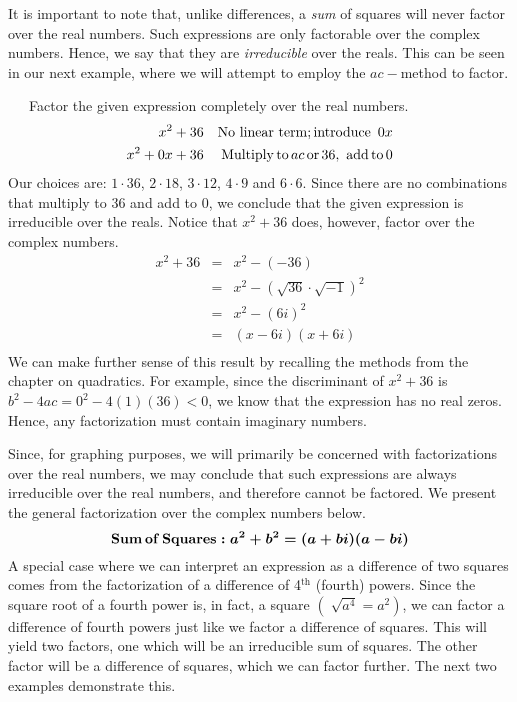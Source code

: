 It is important to note that, unlike differences, a \textit{sum} of squares will never factor over the real numbers.  Such expressions are only factorable over the complex numbers.  Hence, we say that they are \textit{irreducible} over the reals. This can be seen in our next example, where we will attempt to employ the $ac-$method to factor.
\begin{example}~~~Factor the given expression completely over the real numbers.
  \begin{eqnarray*}
    x^2 + 36 &  & \operatorname{No~linear~term}; \operatorname{introduce~} 0 x\\
    x^2 + 0 x + 36 &  & \operatorname{Multiply} \operatorname{to} ac \operatorname{or} 36, \operatorname{~add} \operatorname{to} 0
	\end{eqnarray*}
	Our choices are: $1 \cdot 36$, $2 \cdot 18$, $3 \cdot 12$, $4 \cdot 9$ and $6 \cdot 6$.\pp
	Since there are no combinations that multiply to 36 and add to 0, we conclude that the given expression is irreducible over the reals.\pp
	Notice that $x^2+36$ does, however, factor over the complex numbers.
	\begin{eqnarray*}
	x^2+36 &=& x^2-(-36)\\
	&=&x^2-\left(\sqrt{36}\cdot\sqrt{-1}\right)^2\\
	&=&x^2-(6i)^2\\
	&=&(x-6i)(x+6i)\\
	\end{eqnarray*}
	We can make further sense of this result by recalling the methods from the chapter on quadratics.  For example, since the discriminant of $x^2+36$ is $b^2-4ac=0^2-4(1)(36)<0$, we know that the expression has no real zeros.  Hence, any factorization must contain imaginary numbers.
\end{example}

\newpage

Since, for graphing purposes, we will primarily be concerned with factorizations over the real numbers, we may conclude that such expressions are always irreducible over the real numbers,%
and therefore cannot be factored.  We present the general factorization over the complex numbers below.
\[ \boldsymbol{\operatorname{Sum} \operatorname{of} \operatorname{Squares} : a^2 + b^2 = (a+bi)(a-bi)}
\]
A special case where we can interpret an expression as a difference of two squares comes from the factorization of a
difference of 4$^{\text{th}}$ (fourth) powers. Since the square root of a fourth power is, in fact, a
square $\left(\sqrt[]{a^4} = a^2\right)$, we can factor a difference of fourth powers
just like we factor a difference of squares. This will yield two factors, one which will be an irreducible sum of
squares.  The other factor will be a difference of squares, which we can factor further.  The next two examples demonstrate this.


